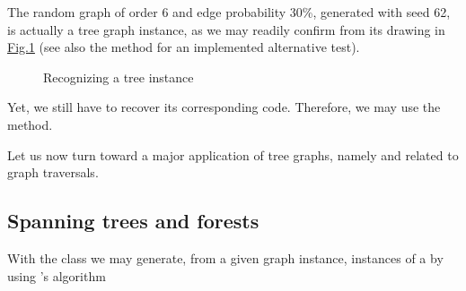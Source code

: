 \documentclass[a4paper,12pt,english]{sphinxhowto}
\let\sphinxpxdimen\pdfpxdimen\else\newdimen\sphinxpxdimen
\begin{document}
The random graph of order 6 and edge probability 30\%, generated with seed 62, is actually a tree graph instance, as we may readily confirm from its  drawing in \hyperref[\detokenize{tutorial:test62tree}]{Fig.\@ \ref{\detokenize{tutorial:test62tree}}} (see also the  method for an implemented alternative test).

\begin{sphinxVerbatim}[commandchars=\\\{\}]
\end{sphinxVerbatim}

\begin{figure}[H]
\centering
\capstart

\noindent\sphinxincludegraphics[width=350\sphinxpxdimen]{{test62}.png}
\caption{Recognizing a tree instance}\label{\detokenize{tutorial:test62tree}}\end{figure}

Yet, we still have to recover its corresponding  code. Therefore, we may use the  method.

\begin{sphinxVerbatim}[commandchars=\\\{\}]
   
\end{sphinxVerbatim}

Let us now turn toward a major application of tree graphs, namely  and  related to graph traversals.


\subsection{Spanning trees and forests}
\label{\detokenize{tutorial:spanning-trees-and-forests}}
With the  class we may generate, from a given  graph  instance,  instances of a  by using ’s algorithm 
\end{document}
